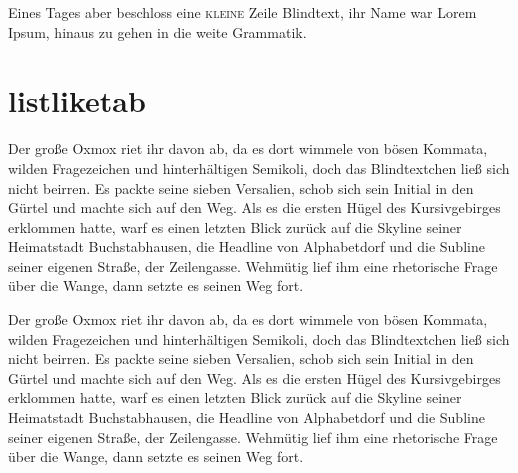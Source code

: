 \documentclass[%
	12pt,%
	a4paper,%
	oneside,%
 liststotoc, idxtotoc, bibtotoc, %
	halfparskip,%
	nochapterprefix,%
	appendixprefix, %
smallheadings,%
]{scrreprt}
\begin{document}
Eines Tages aber beschloss eine \textsc{kleine} Zeile Blindtext, ihr Name war Lorem Ipsum, hinaus zu gehen in die weite Grammatik.


\chapter{listliketab}
Der große Oxmox riet ihr davon ab, da es dort wimmele von bösen Kommata, wilden Fragezeichen und hinterhältigen Semikoli, doch das Blindtextchen ließ sich nicht beirren. Es packte seine sieben Versalien, schob sich sein Initial in den Gürtel und machte sich auf den Weg. Als es die ersten Hügel des Kursivgebirges erklommen hatte, warf es einen letzten Blick zurück auf die Skyline seiner Heimatstadt Buchstabhausen, die Headline von Alphabetdorf und die Subline seiner eigenen Straße, der Zeilengasse. Wehmütig lief ihm eine rhetorische Frage über die Wange, dann setzte es seinen Weg fort.

Der große Oxmox riet ihr davon ab, da es dort wimmele von bösen Kommata, wilden Fragezeichen und hinterhältigen Semikoli, doch das Blindtextchen ließ sich nicht beirren. Es packte seine sieben Versalien, schob sich sein Initial in den Gürtel und machte sich auf den Weg. Als es die ersten Hügel des Kursivgebirges erklommen hatte, warf es einen letzten Blick zurück auf die Skyline seiner Heimatstadt Buchstabhausen, die Headline von Alphabetdorf und die Subline seiner eigenen Straße, der Zeilengasse. Wehmütig lief ihm eine rhetorische Frage über die Wange, dann setzte es seinen Weg fort.
\end{document}

